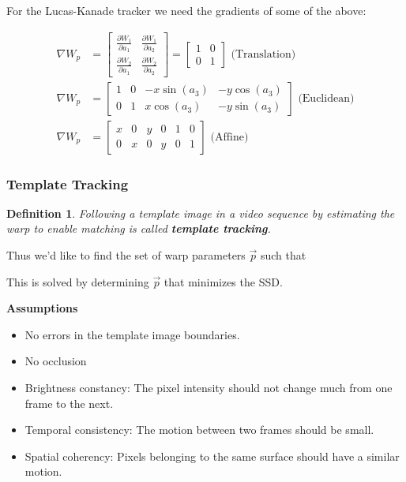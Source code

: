 \documentclass[10pt,a4paper]{scrartcl}
\newtheorem{define}{Definition}
\begin{document}
\begin{multicols*}{2}
For the Lucas-Kanade tracker we need the gradients of some of the above:

\begin{align*}
\nabla W_p &= \begin{bmatrix}
\frac{\partial W_1}{\partial a_1}&\frac{\partial W_1}{\partial a_2}\\
\frac{\partial W_2}{\partial a_1}&\frac{\partial W_2}{\partial a_2}
\end{bmatrix}=\begin{bmatrix}
1&0\\0&1
\end{bmatrix}\text{ (Translation)}\\
\nabla W_p &= \begin{bmatrix}
1&0&-x\sin(a_3)&-y\cos(a_3)\\
0&1&x\cos(a_3)&-y\sin(a_3)
\end{bmatrix}\text{ (Euclidean)}\\
\nabla W_p &= \begin{bmatrix}
x&0&y&0&1&0\\
0&x&0&y&0&1
\end{bmatrix}\text{ (Affine)}
\end{align*}

\subsubsection{Template Tracking}

\begin{define}
Following a template image in a video sequence by estimating the warp to enable matching is called \textbf{template tracking}.
\end{define}

Thus we'd like to find the set of warp parameters $\vec{p}$ such that


This is solved by determining $\vec{p}$ that minimizes the SSD.


\textbf{Assumptions}
\begin{itemize}
\item No errors in the template image boundaries.
\item No occlusion
\item Brightness constancy: The pixel intensity should not change much from one frame to the next.
\item Temporal consistency: The motion between two frames should be small.
\item Spatial coherency: Pixels belonging to the same surface should have a similar motion.
\end{itemize}


\end{multicols*}
\end{document}
